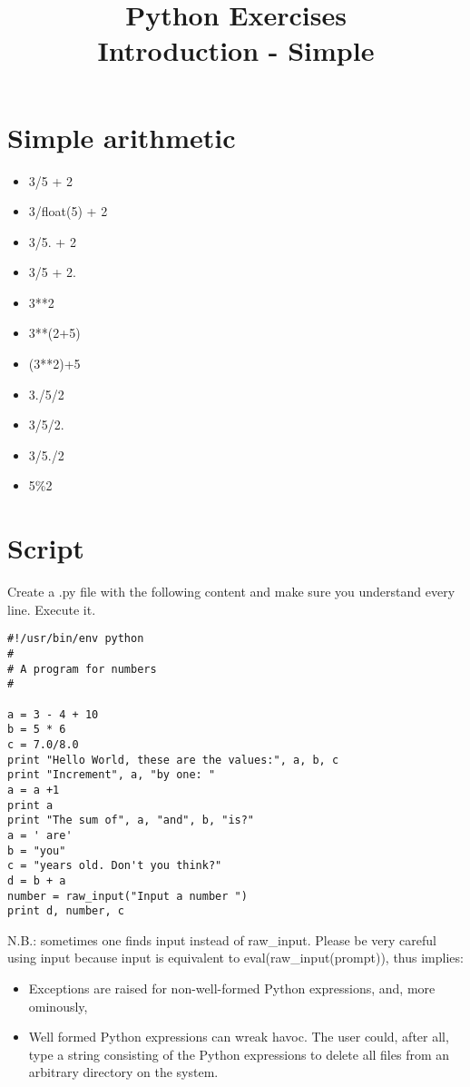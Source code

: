 \documentclass[smallheadings,12pt]{scrartcl}
\title{Python Exercises\\Introduction - Simple}
\date{}
\begin{document}
\maketitle
\section{Simple arithmetic}
\begin{itemize}
\item 3/5 + 2
\item 3/float(5) + 2
\item 3/5. + 2
\item 3/5 + 2.
\item 3**2
\item 3**(2+5)
\item (3**2)+5
\item 3./5/2
\item 3/5/2.
\item 3/5./2
\item 5\%2
\end{itemize}
\pagebreak

\section{Script}
Create a .py file with the following content and make sure you understand every line. Execute it.

\begin{lstlisting}
#!/usr/bin/env python
#
# A program for numbers
#

a = 3 - 4 + 10
b = 5 * 6
c = 7.0/8.0
print "Hello World, these are the values:", a, b, c
print "Increment", a, "by one: "
a = a +1
print a
print "The sum of", a, "and", b, "is?"
a = ' are'
b = "you"
c = "years old. Don't you think?"
d = b + a
number = raw_input("Input a number ")
print d, number, c
\end{lstlisting}

N.B.: sometimes one finds input instead of raw\_input. Please be very careful using input because input is equivalent to eval(raw\_input(prompt)), thus implies:
\begin{itemize}
\item Exceptions are raised for non-well-formed Python expressions, and, more ominously,
\item Well formed Python expressions can wreak havoc. The user could, after all, type a string consisting of the Python expressions to delete all files from an arbitrary directory on the system.
\end{itemize}
\end{document}
